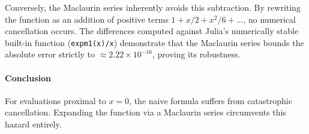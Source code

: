 \begin{solution}
	Conversely, the Maclaurin series inherently avoids this subtraction. By
	rewriting the function as an addition of positive terms $1 + x/2 + x^2/6 +
		\dots$, no numerical cancellation occurs. The differences computed against
	Julia's numerically stable built-in function (\texttt{expm1(x)/x}) demonstrate
	that the Maclaurin series bounds the absolute error strictly to $\approx 2.22
		\times 10^{-16}$, proving its robustness.

	\paragraph{Conclusion}
	For evaluations proximal to $x=0$, the naive formula suffers from catastrophic
	cancellation. Expanding the function via a Maclaurin series circumvents this
	hazard entirely.
\end{solution}
